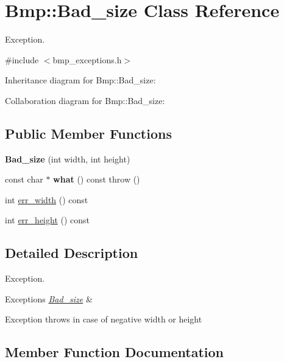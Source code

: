 \hypertarget{classBmp_1_1Bad__size}{}\section{Bmp\+:\+:Bad\+\_\+size Class Reference}
\label{classBmp_1_1Bad__size}


Exception.  




{\ttfamily \#include $<$bmp\+\_\+exceptions.\+h$>$}



Inheritance diagram for Bmp\+:\+:Bad\+\_\+size\+:


Collaboration diagram for Bmp\+:\+:Bad\+\_\+size\+:
\subsection*{Public Member Functions}
\begin{DoxyCompactItemize}
\item 
{\bfseries Bad\+\_\+size} (int width, int height)\hypertarget{classBmp_1_1Bad__size_ae4418e55cd79e2804a46e93a88f347dd}{}\label{classBmp_1_1Bad__size_ae4418e55cd79e2804a46e93a88f347dd}

\item 
const char $\ast$ {\bfseries what} () const   throw ()\hypertarget{classBmp_1_1Bad__size_aee6ddf7cb36dc6e397b0fae264150af3}{}\label{classBmp_1_1Bad__size_aee6ddf7cb36dc6e397b0fae264150af3}

\item 
int \hyperlink{classBmp_1_1Bad__size_a8e0fa6d5e0e561a9dc93a57a2cfb595b}{err\+\_\+width} () const 
\item 
int \hyperlink{classBmp_1_1Bad__size_a2302e117d377c3b5753a9867c3510831}{err\+\_\+height} () const 
\end{DoxyCompactItemize}


\subsection{Detailed Description}
Exception. 


\begin{DoxyExceptions}{Exceptions}
{\em \hyperlink{classBmp_1_1Bad__size}{Bad\+\_\+size}} & \\
\hline
\end{DoxyExceptions}
Exception throws in case of negative width or height 

\subsection{Member Function Documentation}
